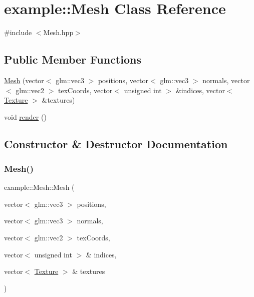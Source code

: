 \hypertarget{classexample_1_1_mesh}{}\section{example\+:\+:Mesh Class Reference}
\label{classexample_1_1_mesh}


{\ttfamily \#include $<$Mesh.\+hpp$>$}

\subsection*{Public Member Functions}
\begin{DoxyCompactItemize}
\item 
\mbox{\hyperlink{classexample_1_1_mesh_ad6e8e007a6952b2194fd1a91e1e69bbd}{Mesh}} (vector$<$ glm\+::vec3 $>$ positions, vector$<$ glm\+::vec3 $>$ normals, vector$<$ glm\+::vec2 $>$ tex\+Coords, vector$<$ unsigned int $>$ \&indices, vector$<$ \mbox{\hyperlink{namespaceexample_a4e4424d0fb5b457e8c00b8a7cdaad0e6}{Texture}} $>$ \&textures)
\item 
void \mbox{\hyperlink{classexample_1_1_mesh_a7832f40434d9fd0fd8fc64d5b81a6f0b}{render}} ()
\end{DoxyCompactItemize}


\subsection{Constructor \& Destructor Documentation}
\mbox{\label{classexample_1_1_mesh_ad6e8e007a6952b2194fd1a91e1e69bbd}} 
\subsubsection{\texorpdfstring{Mesh()}{Mesh()}}
{\footnotesize\ttfamily example\+::\+Mesh\+::\+Mesh (\begin{DoxyParamCaption}\item[{vector$<$ glm\+::vec3 $>$}]{positions,  }\item[{vector$<$ glm\+::vec3 $>$}]{normals,  }\item[{vector$<$ glm\+::vec2 $>$}]{tex\+Coords,  }\item[{vector$<$ unsigned int $>$ \&}]{indices,  }\item[{vector$<$ \mbox{\hyperlink{namespaceexample_a4e4424d0fb5b457e8c00b8a7cdaad0e6}{Texture}} $>$ \&}]{textures }\end{DoxyParamCaption})}



